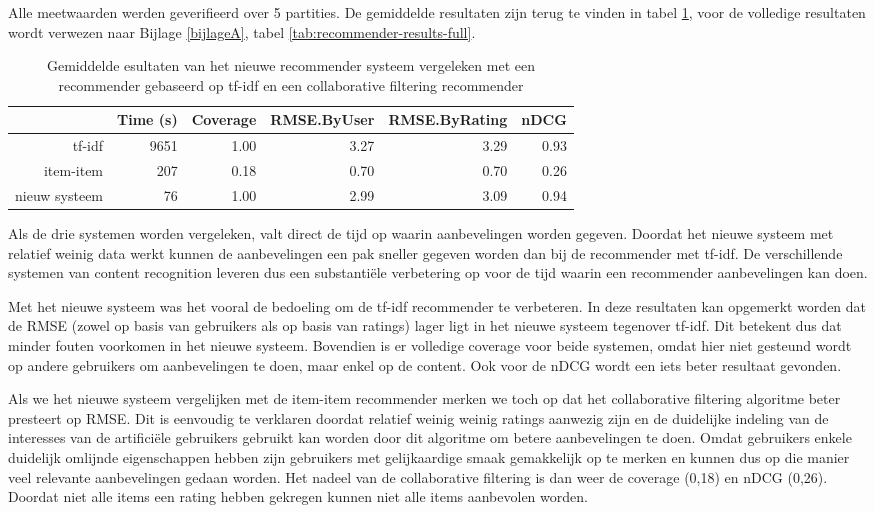 Alle meetwaarden werden geverifieerd over 5 partities. De gemiddelde resultaten zijn terug te vinden in tabel \ref{tab:recommender}, voor de volledige resultaten wordt verwezen naar Bijlage \ref{bijlageA}, tabel \ref{tab:recommender-results-full}.

\begin{table}[htbp] 
\centering 
\caption{Gemiddelde esultaten van het nieuwe recommender systeem vergeleken met een recommender gebaseerd op tf-idf en een collaborative filtering recommender} 
\begin{tabular}{rrrrrr} \toprule & Time (s) & Coverage & RMSE.ByUser & RMSE.ByRating & nDCG \\ \midrule tf-idf & 9651 & 1.00 & 3.27 & 3.29 & 0.93 \\ item-item & 207 & 0.18 & 0.70 & 0.70 & 0.26 \\ nieuw systeem & 76 & 1.00 & 2.99 & 3.09 & 0.94 \\ \bottomrule 
\end{tabular}%
\label{tab:recommender}%
\end{table}%

Als de drie systemen worden vergeleken, valt direct de tijd op waarin aanbevelingen worden gegeven. Doordat het nieuwe systeem met relatief weinig data werkt kunnen de aanbevelingen een pak sneller gegeven worden dan bij de recommender met tf-idf. De verschillende systemen van content recognition leveren dus een substanti\"ele verbetering op voor de tijd waarin een recommender aanbevelingen kan doen.

Met het nieuwe systeem was het vooral de bedoeling om de tf-idf recommender te verbeteren. In deze resultaten kan opgemerkt worden dat de RMSE (zowel op basis van gebruikers als op basis van ratings) lager ligt in het nieuwe systeem tegenover tf-idf. Dit betekent dus dat minder fouten voorkomen in het nieuwe systeem. Bovendien is er volledige coverage voor beide systemen, omdat hier niet gesteund wordt op andere gebruikers om aanbevelingen te doen, maar enkel op de content. Ook voor de nDCG wordt een iets beter resultaat gevonden. 

Als we het nieuwe systeem vergelijken met de item-item recommender merken we toch op dat het collaborative filtering algoritme beter presteert op RMSE. Dit is eenvoudig te verklaren doordat relatief weinig weinig ratings aanwezig zijn en de duidelijke indeling van de interesses van de artifici\"ele gebruikers gebruikt kan worden door dit algoritme om betere aanbevelingen te doen. Omdat gebruikers enkele duidelijk omlijnde eigenschappen hebben zijn gebruikers met gelijkaardige smaak gemakkelijk op te merken en kunnen dus op die manier veel relevante aanbevelingen gedaan worden. Het nadeel van de collaborative filtering is dan weer de coverage (0,18) en nDCG (0,26). Doordat niet alle items een rating hebben gekregen kunnen niet alle items aanbevolen worden.

